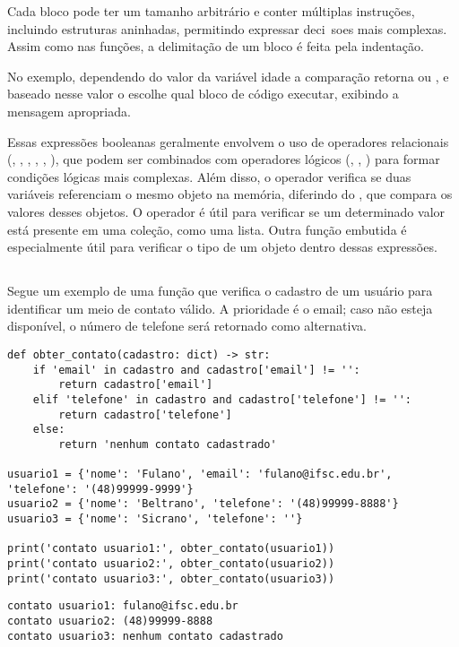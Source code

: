 Cada bloco pode ter um tamanho arbitrário e conter múltiplas instruções, incluindo estruturas 
aninhadas, permitindo expressar deci~soes mais complexas.
Assim como nas funções, a delimitação de um bloco  é feita pela indentação.

No exemplo, dependendo do valor da variável idade a comparação  retorna  ou
, e baseado nesse valor o  escolhe qual bloco de código executar, exibindo a mensagem apropriada.

Essas expressões booleanas geralmente envolvem o uso de operadores relacionais
(\inlcode{==}, \inlcode{!=}, \inlcode{>}, \inlcode{<}, \inlcode{>=}, \inlcode{<=}), que podem ser combinados com
operadores lógicos (, , ) para formar condições lógicas mais complexas.
Além disso, o operador  verifica se duas variáveis referenciam o mesmo objeto na memória, diferindo
do \inlcode{==}, que compara os valores desses objetos.
O operador  é útil para verificar se um determinado valor está presente em uma coleção, como uma lista.
Outra função embutida  é especialmente útil para verificar o tipo de um objeto
dentro dessas expressões.

\subsection{}
Segue um exemplo de uma função que verifica o cadastro de um usuário para identificar um meio de contato válido.
A prioridade é o email; caso não esteja disponível, o número de telefone será retornado como alternativa.
\begin{verbatim}
def obter_contato(cadastro: dict) -> str:
    if 'email' in cadastro and cadastro['email'] != '':
        return cadastro['email']
    elif 'telefone' in cadastro and cadastro['telefone'] != '':
        return cadastro['telefone']
    else:
        return 'nenhum contato cadastrado'

usuario1 = {'nome': 'Fulano', 'email': 'fulano@ifsc.edu.br', 'telefone': '(48)99999-9999'}
usuario2 = {'nome': 'Beltrano', 'telefone': '(48)99999-8888'}
usuario3 = {'nome': 'Sicrano', 'telefone': ''}

print('contato usuario1:', obter_contato(usuario1))
print('contato usuario2:', obter_contato(usuario2))
print('contato usuario3:', obter_contato(usuario3))
\end{verbatim}
\begin{verbatim}
contato usuario1: fulano@ifsc.edu.br
contato usuario2: (48)99999-8888
contato usuario3: nenhum contato cadastrado
\end{verbatim}

